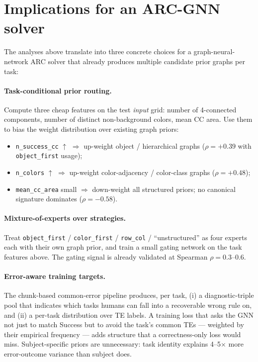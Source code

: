 \documentclass[11pt]{article}
\begin{document}
\section{Implications for an ARC-GNN solver}
\label{sec:gnn}

The analyses above translate into three concrete choices for a
graph-neural-network ARC solver that already produces multiple
candidate prior graphs per task:

\paragraph{Task-conditional prior routing.}
Compute three cheap features on the test \emph{input} grid:
number of 4-connected components, number of distinct non-background
colors, mean CC area. Use them to bias the weight distribution over
existing graph priors:

\begin{itemize}[leftmargin=*, topsep=2pt, itemsep=1pt]
  \item \texttt{n\_success\_cc} $\uparrow$ $\Rightarrow$
        up-weight object / hierarchical graphs ($\rho = +0.39$ with
        \texttt{object\_first} usage);
  \item \texttt{n\_colors} $\uparrow$ $\Rightarrow$ up-weight
        color-adjacency / color-class graphs ($\rho = +0.48$);
  \item \texttt{mean\_cc\_area} small $\Rightarrow$ down-weight all
        structured priors; no canonical signature dominates
        ($\rho = -0.58$).
\end{itemize}

\paragraph{Mixture-of-experts over strategies.}
Treat \texttt{object\_first} / \texttt{color\_first} /
\texttt{row\_col} / ``unstructured'' as four experts each with their
own graph prior, and train a small gating network on the task
features above. The gating signal is already validated at Spearman
$\rho = 0.3$--$0.6$.

\paragraph{Error-aware training targets.}
The chunk-based common-error pipeline produces, per task,
(i) a diagnostic-triple pool that indicates which tasks humans can
fall into a recoverable wrong rule on, and (ii) a per-task distribution
over TE labels. A training loss that asks the GNN not just to match
Success but to avoid the task's common TEs --- weighted by their
empirical frequency --- adds structure that a correctness-only loss
would miss. Subject-specific priors are unnecessary: task
identity explains 4--5$\times$ more error-outcome variance than
subject does.
\end{document}
